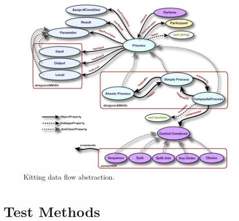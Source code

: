 
\begin{figure}[htb]
\begin{multicols}{1}
\includegraphics[width=16cm]{images/OWL-S.jpg}
\caption{Kitting data flow abstraction.}
\label{fig:ProcessDataFlow}
\end{multicols}
\end{figure}



\section{Test Methods}
\label{sect:TestMethods}


